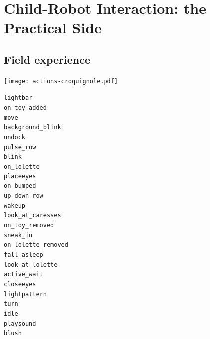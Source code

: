\documentclass[compress]{beamer}
\begin{document}


\section[Practical CRI]{Child-Robot Interaction: the Practical Side}

\subsection{Field experience}


{
\begin{frame}{}
    \centering
    \texttt{[image: actions-croquignole.pdf]}

    \begin{multicols}{3}
\scriptsize
{\tt lightbar} \\
{\tt on\_toy\_added} \\
{\tt move} \\
{\tt background\_blink} \\
{\tt undock} \\
{\tt pulse\_row} \\
{\tt blink} \\
{\tt on\_lolette} \\
{\tt placeeyes} \\
{\tt on\_bumped} \\
{\tt up\_down\_row} \\
{\tt wakeup} \\
{\tt look\_at\_caresses} \\
{\tt on\_toy\_removed} \\
{\tt sneak\_in} \\
{\tt on\_lolette\_removed} \\
{\tt fall\_asleep} \\
{\tt look\_at\_lolette} \\
{\tt active\_wait} \\
{\tt closeeyes} \\
{\tt lightpattern} \\
{\tt turn} \\
{\tt idle} \\
{\tt playsound} \\
{\tt blush}

    \end{multicols}
\end{frame}
}
\end{document}
